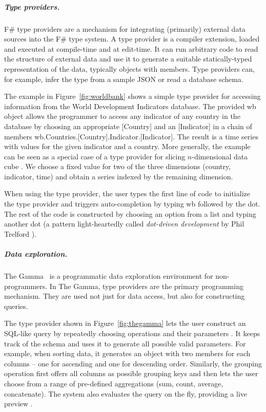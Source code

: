 \documentclass[anonymous, a4paper,UKenglish,cleveref, autoref, thm-restate]{lipics-v2021}
\newcommand{\ident}[1]{\textsf{#1}}
\begin{document}

\subparagraph{Type providers.}

F\# type providers \cite{syme-2013-inforich} are a mechanism for integrating (primarily) external data
sources into the F\# type system. A type provider is a compiler extension, loaded and
executed at compile-time and at edit-time. It can run arbitrary code to read the structure of
external data and use it to generate a suitable statically-typed representation of the
data, typically objects with members. Type providers can, for example, infer the type from a
sample JSON \cite{petricek-2016-fsdata} or read a database schema.

The example in Figure~\ref{fig:worldbank} shows a simple type provider for accessing information
from the World Development Indicators database. The provided \ident{wb} object allows the programmer
to access any indicator of any country in the database by choosing an appropriate \ident{[Country]}
and an \ident{[Indicator]} in a chain of members
\ident{wb}.\ident{Countries}.\ident{[Country]}.\ident{Indicator}.\ident{[Indicator]}.
The result is a time series with values for the given indicator and a country. More generally,
the example can be seen as a special case of a type provider for slicing $n$-dimensional
data cube \cite{petricek-2022-thegamma}. We choose a fixed value for two of the three
dimensions (country, indicator, time) and obtain a series indexed by the remaining dimension.

When using the type provider, the user types the first line of code to initialize the type provider
and triggers auto-completion by typing \ident{wb} followed by the dot. The rest of the code is
constructed by choosing an option from a list and typing another dot (a pattern light-heartedly
called \emph{dot-driven development} by Phil Trelford \cite{seemann-2021-head}).



\subparagraph{Data exploration.}

The Gamma~\cite{petricek-2022-thegamma} is a programmatic data exploration environment
for non-programmers. In The Gamma, type providers are the primary programming mechanism. They
are used not just for data access, but also for constructing queries.

The type provider shown in Figure~\ref{fig:thegamma} lets the user construct an SQL-like query by
repeatedly choosing operations and their parameters \cite{petricek-2017-dotdriven}. It keeps track
of the schema and uses it to generate all possible valid parameters. For example, when sorting data, it generates
an object with two members for each columns -- one for ascending and one for descending order.
Similarly, the grouping operation first offers all columns as possible grouping keys and then
lets the user choose from a range of pre-defined aggregations (sum, count, average, concatenate).
The system also evaluates the query on the fly, providing a live preview \cite{petricek-2020-live}.
\end{document}
